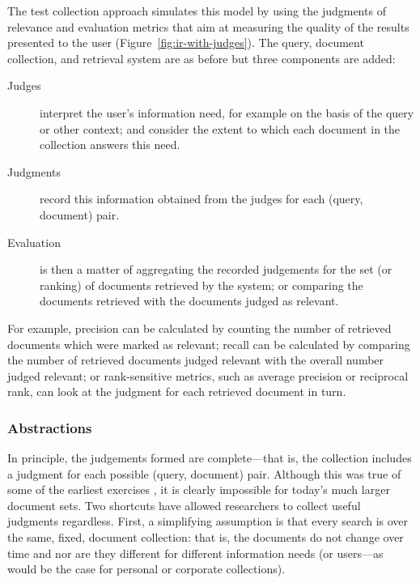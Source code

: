 The test collection approach simulates this model by using the judgments of relevance and evaluation metrics that aim at measuring the quality of the results presented to the user  (Figure~\ref{fig:ir-with-judges}). The query, document collection, and retrieval system are as before but three components are added:


\begin{description}
	\item[Judges] interpret the user's information need, for example on the basis of the query or other context; and consider the extent to which each document in the collection answers this need.
	
	\item[Judgments] record this information obtained from the judges for each (query, document) pair.
	
	\item[Evaluation] is then a matter of aggregating the recorded judgements for the set (or ranking) of documents retrieved by the system; or comparing the documents retrieved with the documents judged as relevant.
\end{description}

For example, precision can be calculated by counting the number of retrieved documents which were marked as relevant; recall can be calculated by comparing the number of retrieved documents judged relevant with the overall number judged relevant; or rank-sensitive metrics, such as average precision or reciprocal rank, can look at the judgment for each retrieved document in turn.

\subsubsection{Abstractions}
In principle, the judgements formed are complete---that is, the collection includes a judgment for each possible (query, document) pair. Although this was true of some of the earliest exercises \citep{cleverdon66}, it is clearly impossible for today's much larger document sets. Two shortcuts have allowed researchers to collect useful judgments regardless.  First, a simplifying assumption is that every search is over the same, fixed, document collection: that is, the documents do not change over time and nor are they different for different information needs (or users---as would be the case for personal or corporate collections).

